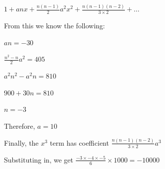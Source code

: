 \documentclass[../main.tex]{subfiles}
\begin{document}
\begin{enumerate}
    \(1+anx+\frac{n(n-1)}{2}a^2x^2+\frac{n(n-1)(n-2)}{3\times 2}+\dots \)

    From this we know the following:

    \(an = -30 \)

    \(\frac{n^2-n}{2}a^2=405 \)

    \(a^2n^2-a^2n=810 \)
    
    \(900+30n=810 \)

    \(n=-3\)

    Therefore, \(a=10\)

    Finally, the \(x^3\) term has coefficient \(\frac{n(n-1)(n-2)}{3\times 2}a^3 \)

    Substituting in, we get \(\frac{-3 \times -4 \times -5}{6}\times 1000 = -10000 \) 
    
\end{enumerate}
\end{document}
